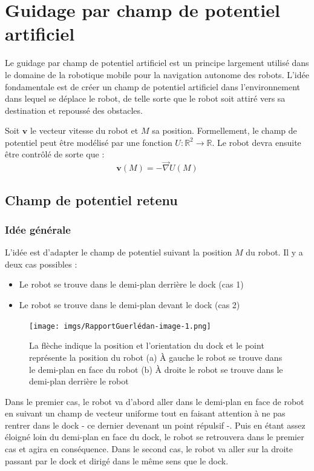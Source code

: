 \documentclass[12pt]{report}
\begin{document}
\section{Guidage par champ de potentiel artificiel}

Le guidage par champ de potentiel artificiel est un principe largement utilisé dans le domaine de la robotique mobile pour la navigation autonome des robots. L'idée fondamentale est de créer un champ de potentiel artificiel dans l'environnement dans lequel se déplace le robot, de telle sorte que le robot soit attiré vers sa destination et repoussé des obstacles.

Soit $\mathbf{v}$ le vecteur vitesse du robot et $M$ sa position. Formellement, le champ de potentiel peut être modélisé par une fonction $U : \mathbb{R}^2 \rightarrow \mathbb{R}$. Le robot devra ensuite être contrôlé de sorte que :
\[ \mathbf{v} (M) = - \vec{\nabla} U (M) \]

\subsection{Champ de potentiel retenu}

\subsubsection{Idée générale}

L'idée est d'adapter le champ de potentiel suivant la position $M$ du robot. Il y a deux cas possibles :
\begin{itemize}
  \item Le robot se trouve dans le demi-plan derrière le dock (cas 1)
  
  \item Le robot se trouve dans le demi-plan devant le dock (cas 2)
\end{itemize}
\begin{figure}[!h]
  \centering
  \texttt{[image: imgs/RapportGuerlédan-image-1.png]}
  \caption{La flèche indique la position et l'orientation du dock et le point représente la position du robot (a) À gauche le robot se trouve dans le demi-plan en face du robot (b) À droite le robot se trouve dans le demi-plan derrière le robot}
\end{figure}

Dans le premier cas, le robot va d'abord aller dans le demi-plan en face de robot en suivant un champ de vecteur uniforme tout en faisant attention à ne pas rentrer dans le dock - ce dernier devenant un point répulsif -. Puis en étant assez éloigné loin du demi-plan en face du dock, le robot se retrouvera dans le premier cas et agira en conséquence. Dans le second cas, le robot va aller sur la droite passant par le dock et dirigé dans le même sens que le dock.
\end{document}
